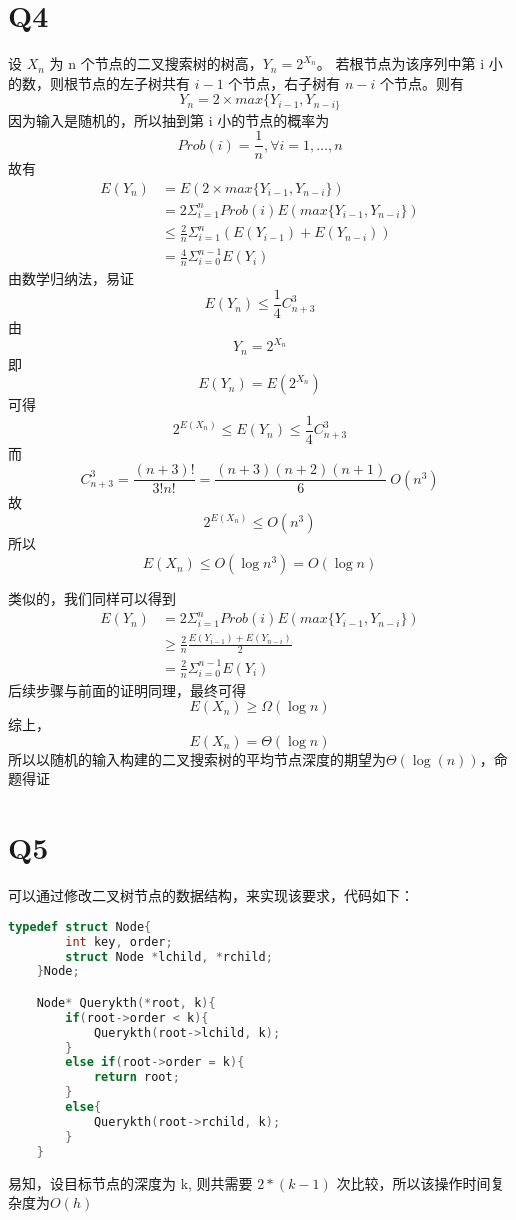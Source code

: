 \documentclass[UTF8]{ctexart} %
\begin{document}
\begin{sloppypar}
\section*{Q4}
设 $X_n$ 为 n 个节点的二叉搜索树的树高，$Y_n = 2^{X_n}$。
若根节点为该序列中第 i 小的数，则根节点的左子树共有 $i-1$
个节点，右子树有 $n-i$ 个节点。则有
\begin{equation*}
    Y_n = 2 \times max\{Y_{i-1}, Y_{n-i\}}
\end{equation*}
因为输入是随机的，所以抽到第 i 小的节点的概率为
\begin{equation*}
    Prob(i) = \frac{1}{n}, \forall i = 1, \dots, n
\end{equation*}
故有
\begin{align*}
    E(Y_n) &= E(2 \times max\{Y_{i-1}, Y_{n-i}\})\\
           &= 2\Sigma_{i=1}^{n} Prob(i)E(max\{Y_{i-1}, Y_{n-i}\})\\
           &\leq \frac{2}{n} \Sigma_{i=1}^{n}(E(Y_{i-1})+E(Y_{n-i}))\\
           &= \frac{4}{n} \Sigma_{i=0}^{n-1}E(Y_i)
\end{align*}
由数学归纳法，易证 $$E(Y_n) \leq \frac{1}{4} C_{n+3}^{3}$$
由$$Y_n = 2^{X_n}$$
即$$E(Y_n) = E(2^{X_n})$$
可得$$2^{E(X_n)} \leq E(Y_n) \leq \frac{1}{4}C_{n+3}^3$$
而$$C_{n+3}^3 = \frac{(n+3)!}{3!n!} = \frac{(n+3)(n+2)(n+1)}{6}~O(n^3)$$
故$$2^{E(X_n)} \leq O(n^3)$$
所以$$E(X_n) \leq O(\log n^3) = O(\log n)$$

类似的，我们同样可以得到
\begin{align*}
    E(Y_n)  &= 2\Sigma_{i=1}^{n} Prob(i)E(max\{Y_{i-1}, Y_{n-i}\})\\
            &\geq \frac{2}{n} \frac{E(Y_{i-1})+E(Y_{n-i})}{2}\\
            &= \frac{2}{n} \Sigma_{i=0}^{n-1} E(Y_i)
\end{align*}
后续步骤与前面的证明同理，最终可得$$E(X_n) \geq \Omega(\log n)$$
综上，$$E(X_n) = \Theta(\log n)$$
所以以随机的输入构建的二叉搜索树的平均节点深度的期望为$\Theta(\log(n))$，命题得证

\section*{Q5}
可以通过修改二叉树节点的数据结构，来实现该要求，代码如下：
    \begin{lstlisting}[language=C]
    typedef struct Node{
        int key, order;
        struct Node *lchild, *rchild;
    }Node;

    Node* Querykth(*root, k){
        if(root->order < k){
            Querykth(root->lchild, k);
        }
        else if(root->order = k){
            return root;
        }
        else{
            Querykth(root->rchild, k);
        }
    }
    \end{lstlisting}
易知，设目标节点的深度为 k, 则共需要 $2*(k-1)$ 次比较，所以该操作时间复杂度为$O(h)$
\end{sloppypar}
\end{document}
